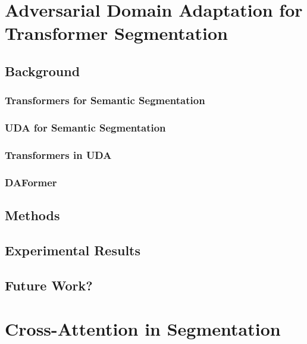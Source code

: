 \documentclass[a4paper,12pt]{report}
\begin{document}
\chapter{Adversarial Domain Adaptation for Transformer Segmentation}

\section{Background}

    \subsection*{Transformers for Semantic Segmentation}

    \subsection*{UDA for Semantic Segmentation}

    \subsection*{Transformers in UDA}

    \subsection*{DAFormer}

\section{Methods}

\section{Experimental Results}

\section{Future Work?}

\chapter{Cross-Attention in Segmentation}
\end{document}
